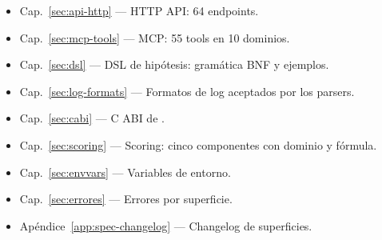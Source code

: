 \begin{itemize}
    \item Cap.~\ref{sec:api-http} — HTTP API: 64 endpoints.
    \item Cap.~\ref{sec:mcp-tools} — MCP: 55 tools en 10 dominios.
    \item Cap.~\ref{sec:dsl} — DSL de hipótesis: gramática BNF y
    ejemplos.
    \item Cap.~\ref{sec:log-formats} — Formatos de log aceptados
    por los parsers.
    \item Cap.~\ref{sec:cabi} — C ABI de .
    \item Cap.~\ref{sec:scoring} — Scoring: cinco componentes con
    dominio y fórmula.
    \item Cap.~\ref{sec:envvars} — Variables de entorno.
    \item Cap.~\ref{sec:errores} — Errores por superficie.
    \item Apéndice~\ref{app:spec-changelog} — Changelog de
    superficies.
\end{itemize}

